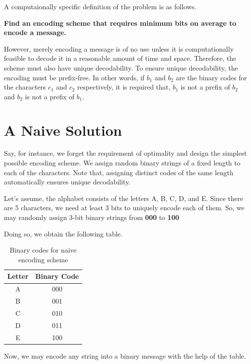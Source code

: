 \documentclass[18pt]{article}
\begin{document}
	A computaionally specific definition of the problem is as follows.
	
	\textbf{Find an encoding scheme that requires
		minimum bits on average to encode a message.}
	
	However, merely encoding a message is of no use unless it is computationally feasible to decode it in a reasonable amount of time and space. Therefore, the scheme must also have unique decodability. To ensure unique decodability, the encoding must be prefix-free. In other words, if $b_1$ and $b_2$ are the binary codes for the characters $c_1$ and $c_2$ respectively, it is required that, $b_1$ is not a prefix of $b_2$ and $b_2$ is not a prefix of $b_1$.
	
	
	
	\section{A Naive Solution}
	
	Say, for instance, we forget the requirement of optimality and design the simplest possible encoding scheme. We assign random binary strings of a fixed length to each of the characters. Note that, assigning distinct codes of the same length automatically ensures unique decodability.
	
	Let's assume, the alphabet consists of the letters A, B, C, D, and E. Since there are 5 characters, we need at least 3 bits to uniquely encode each of them. So, we may randomly assign 3-bit binary strings from \textbf{000} to \textbf{100}
	
	Doing so, we obtain the following table.
	
	\begin{table}[h]
		\centering
		\begin{tabular}{|c|c|}
			\hline
			\textbf{Letter} & \textbf{Binary Code} \\
			\hline
			A & 000  \\
			B & 001  \\
			C & 010 \\
			D & 011 \\
			E & 100 \\
			\hline
		\end{tabular}
		\caption{Binary codes for naive encoding scheme}
	\end{table}
	
	Now, we may encode any string into a binary message with the help of the table.
	
\end{document}
